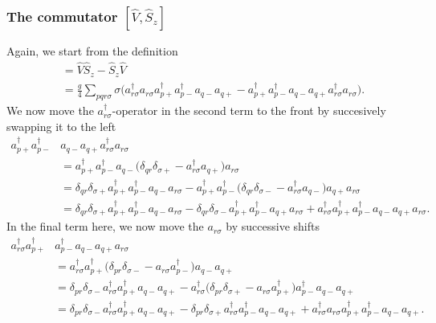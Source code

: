 \documentclass[a4paper, 11pt, notitlepage, english]{article}
\newcommand{\op}[1]{\hat{#1}}
\begin{document}
\clearpage

\subsubsection*{The commutator $[\op{V}, \op{S}_z]$}
Again, we start from the definition
\begin{align*}
[\op{V}, \op{S}_z] &= \op{V}\op{S}_z - \op{S}_z\op{V} \\
&= \frac{g}{4}\sum_{pqr\sigma} \sigma \bigg(a_{r\sigma}^\dagger a_{r\sigma} a_{p+}^\dagger a_{p-}^\dagger a_{q-} a_{q+} - a_{p+}^\dagger a_{p-}^\dagger a_{q-} a_{q+} a_{r\sigma}^\dagger a_{r\sigma} \bigg).
\end{align*}
We now move the $a_{r\sigma}^\dagger$-operator in the second term to the front by succesively swapping it to the left
\begin{align*}
a_{p+}^\dagger a_{p-}^\dagger &a_{q-} a_{q+} a_{r\sigma}^\dagger a_{r\sigma} \\ 
&= a_{p+}^\dagger a_{p-}^\dagger a_{q-} \big(\delta_{qr}\delta_{\sigma+} -  a_{r\sigma}^\dagger a_{q+} \big) a_{r\sigma} \\
&=\delta_{qr}\delta_{\sigma+} a_{p+}^\dagger a_{p-}^\dagger a_{q-} a_{r\sigma}  - a_{p+}^\dagger a_{p-}^\dagger \big(\delta_{qr}\delta_{\sigma-} -  a_{r\sigma}^\dagger a_{q-} \big) a_{q+} a_{r\sigma} \\
&=\delta_{qr}\delta_{\sigma+} a_{p+}^\dagger a_{p-}^\dagger a_{q-} a_{r\sigma}  - \delta_{qr}\delta_{\sigma-} a_{p+}^\dagger a_{p-}^\dagger a_{q+} a_{r\sigma} +  a_{r\sigma}^\dagger  a_{p+}^\dagger a_{p-}^\dagger a_{q-}  a_{q+} a_{r\sigma}.
\end{align*}
In the final term here, we now move the $a_{r\sigma}$ by successive shifts
\begin{align*}
a_{r\sigma}^\dagger  a_{p+}^\dagger & a_{p-}^\dagger a_{q-}  a_{q+} a_{r\sigma} \\
&= a_{r\sigma}^\dagger  a_{p+}^\dagger \big(\delta_{pr} \delta_{\sigma -} -  a_{r\sigma} a_{p-}^\dagger\big) a_{q-}  a_{q+} \\
&= \delta_{pr} \delta_{\sigma -} a_{r\sigma}^\dagger  a_{p+}^\dagger a_{q-}  a_{q+} -  a_{r\sigma}^\dagger  \big(\delta_{pr}\delta_{\sigma+} - a_{r\sigma}a_{p+}^\dagger\big) a_{p-}^\dagger a_{q-}  a_{q+} \\
&= \delta_{pr} \delta_{\sigma -} a_{r\sigma}^\dagger  a_{p+}^\dagger a_{q-}  a_{q+} -  \delta_{pr}\delta_{\sigma+} a_{r\sigma}^\dagger  a_{p-}^\dagger a_{q-}  a_{q+} + a_{r\sigma}^\dagger a_{r\sigma}a_{p+}^\dagger a_{p-}^\dagger a_{q-}  a_{q+}.\\
\end{align*}
\end{document}
